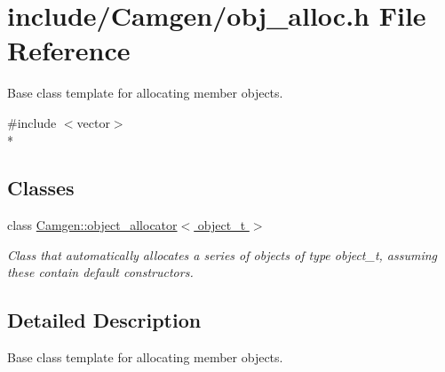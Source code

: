 \hypertarget{a00704}{}\section{include/\+Camgen/obj\+\_\+alloc.h File Reference}
\label{a00704}


Base class template for allocating member objects.  


{\ttfamily \#include $<$vector$>$}\\*
\subsection*{Classes}
\begin{DoxyCompactItemize}
\item 
class \hyperlink{a00389}{Camgen\+::object\+\_\+allocator$<$ object\+\_\+t $>$}
\begin{DoxyCompactList}\small\item\em Class that automatically allocates a series of objects of type object\+\_\+t, assuming these contain default constructors. \end{DoxyCompactList}\end{DoxyCompactItemize}


\subsection{Detailed Description}
Base class template for allocating member objects. 

